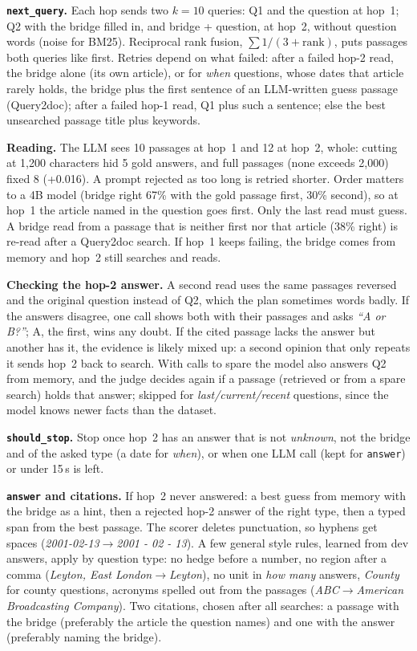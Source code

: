 \documentclass[10pt,a4paper]{article}
\begin{document}
\textbf{\texttt{next\_query}.} Each hop sends two $k{=}10$ queries: Q1 and the question at hop~1; Q2 with the
bridge filled in, and bridge + question, at hop~2, without question words (noise for BM25). Reciprocal rank
fusion, $\sum 1/(3+\mathrm{rank})$, puts passages both queries like first. Retries depend on what failed: after a
failed hop-2 read, the bridge alone (its own article), or for \emph{when} questions, whose dates that article
rarely holds, the bridge plus the first sentence of an LLM-written guess passage (Query2doc); after a failed hop-1
read, Q1 plus such a sentence; else the best unsearched passage title plus keywords.

\textbf{Reading.} The LLM sees 10 passages at hop~1 and 12 at hop~2, whole: cutting at 1,200 characters hid 5
gold answers, and full passages (none exceeds 2,000) fixed 8 (+0.016). A prompt rejected as too long is retried shorter. Order matters to a 4B model (bridge right 67\% with the gold passage first, 30\%
second), so at hop~1 the article named in the question goes first. Only the last read must guess. A bridge read from a passage that is neither first nor that article (38\% right) is re-read after a
Query2doc search. If hop~1 keeps failing, the bridge comes from memory and hop~2 still searches and reads.

\textbf{Checking the hop-2 answer.} A second read uses the same passages reversed and the original question
instead of Q2, which the plan sometimes words badly. If the answers disagree, one call shows both with their passages and asks \emph{``A or B?''}; A, the first, wins any doubt. If the cited
passage lacks the answer but another has it, the evidence is likely mixed up: a second opinion that only repeats
it sends hop~2 back to search. With calls to spare the model also answers Q2 from memory, and the judge decides
again if a passage (retrieved or from a spare search) holds that answer; skipped for \emph{last/current/recent}
questions, since the model knows newer facts than the dataset.

\textbf{\texttt{should\_stop}.} Stop once hop~2 has an answer that is not \emph{unknown}, not the bridge and of
the asked type (a date for \emph{when}), or when one LLM call (kept for \texttt{answer}) or under 15\,s is left.

\textbf{\texttt{answer} and citations.} If hop~2 never answered: a best guess from memory with the bridge as a
hint, then a rejected hop-2 answer of the right type, then a typed span from the best passage. The scorer deletes punctuation, so hyphens get spaces (\emph{2001-02-13}$\to$\emph{2001 - 02 - 13}).
A few general style rules, learned from dev answers, apply by question type: no hedge before a number, no region after a comma (\emph{Leyton, East
London}$\to$\emph{Leyton}), no unit in \emph{how many} answers, \emph{County} for county questions, acronyms spelled out from the passages
(\emph{ABC}$\to$\emph{American Broadcasting Company}). Two citations, chosen after all searches: a passage with the
bridge (preferably the article the question names) and one with the answer (preferably naming the bridge).
\end{document}
